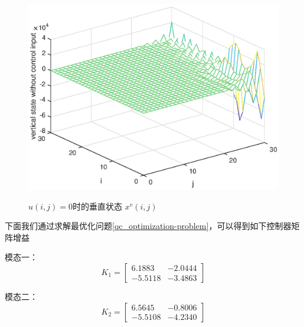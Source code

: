 	\begin{figure}[!htb]
		\centering\includegraphics[scale=0.6]{./figures/qc/simulation/vstateU0.eps}\\ 
		\caption{$u(i,j)=0$时的垂直状态 $x^{v}(i,j)$}
		\label{figqcvstate}
	\end{figure}
	
	下面我们通过求解最优化问题\eqref{qc_optimization-problem}，可以得到如下控制器矩阵增益
	
	模态一：
	\begin{equation*}
	K_{1}=\begin{bmatrix}
	 6.1883   &-2.0444\\
	-5.5118   &-3.4863
	\end{bmatrix}
	\end{equation*}
	
	模态二：
	\begin{equation*}
	K_{2} = 	\begin{bmatrix}
	6.5645   &-0.8006\\
	-5.5108   &-4.2340
	\end{bmatrix}
	\end{equation*}
	
